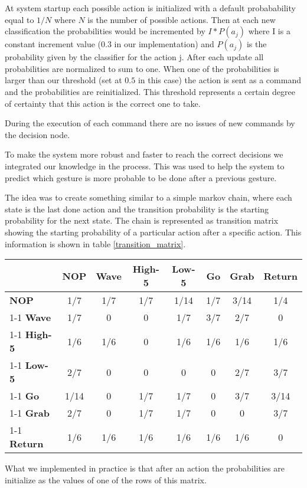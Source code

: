 At system startup each possible action is initialized with a default probabability equal to $1/N$ where $N$ is the number of possible actions.  
Then at each new classification the probabilities would be incremented by $I*P(a_j)$ where I is a constant increment value ($0.3$ in our implementation) and $P(a_j)$ is the probability given by the classifier for the action j. 
After each update all probabilities are normalized to sum to one.
When one of the probabilities is larger than our threshold (set at $0.5$ in this case) the action is sent as a command and the probabilities are reinitialized. This threshold represents a certain degree of certainty that this action is the correct one to take.

During the execution of each command there are no issues of new commands by the decision node.

To make the system more robust and faster to reach the correct decisions we integrated our knowledge in the process. This was used to help the system to predict which gesture is more probable to be done after a previous gesture. 

The idea was to create something similar to a simple markov chain, where each state is the last done action and the transition 
probability is the starting probability for the next state. 
The chain is represented as transition matrix showing the starting probability of a particular action after a specific action. This information is shown in table \ref{transition_matrix}. 

\begin{table*}[t]
\centering
\caption{Transition Matrix}
\label{transition_matrix}
\begin{tabular}{|l|ccccccc|}
\hline
 & \multicolumn{1}{c|}{\textbf{NOP}} & \multicolumn{1}{c|}{\textbf{Wave}} & \multicolumn{1}{c|}{\textbf{High-5}} & \multicolumn{1}{c|}{\textbf{Low-5}} & \multicolumn{1}{c|}{\textbf{Go}} & \multicolumn{1}{c|}{\textbf{Grab}} & \textbf{Return} \\ \hline
\textbf{NOP} & 1/7 & 1/7 & 1/7 & 1/14 & 1/7 & 3/14 & 1/4 \\ \cline{1-1}
\textbf{Wave} & 1/7 & 0 & 0 & 1/7 & 3/7 & 2/7 & 0 \\ \cline{1-1}
\textbf{High-5} & 1/6 & 1/6 & 0 & 1/6 & 1/6 & 1/6 & 1/6 \\ \cline{1-1}
\textbf{Low-5} & 2/7 & 0 & 0 & 0 & 0 & 2/7 & 3/7 \\ \cline{1-1}
\textbf{Go} & 1/14 & 0 & 1/7 & 1/7 & 0 & 3/7 & 3/14 \\ \cline{1-1}
\textbf{Grab} & 2/7 & 0 & 1/7 & 1/7 & 0 & 0 & 3/7 \\ \cline{1-1}
\textbf{Return} & 1/6 & 1/6 & 1/6 & 1/6 & 1/6 & 1/6 & 0 \\ \hline
\end{tabular}
\end{table*}

What we implemented in practice is that after an action the probabilities are initialize as the values of one of the rows of this matrix.